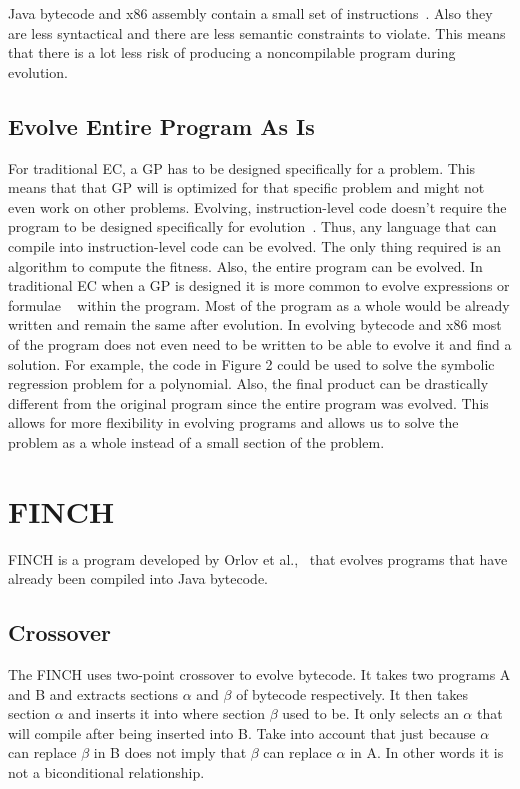 \documentclass{sig-alternate}
\begin{document}
Java bytecode and x86 assembly contain a small set of instructions~\cite{Assembly:2010}. Also they are less syntactical and there are less semantic constraints to violate. This means that there is a lot less risk of producing a noncompilable program during evolution. 

\subsection{Evolve Entire Program As Is}
For traditional EC, a GP has to be designed specifically for a problem. This means that that GP will is optimized for that specific problem and might not even work on other problems.  Evolving, instruction-level code doesn't require the program to be designed specifically for evolution~\cite{Assembly:2010,FINCH:2011}. Thus, any language that can compile into instruction-level code can be evolved. The only thing required is an algorithm to compute the fitness. Also, the entire program can be evolved. In traditional EC when a GP is designed it is more common to evolve expressions or formulae ~\cite{FINCH:2011} within the program. Most of the program as a whole would be already written and remain the same after evolution. In evolving bytecode and x86 most of the program does not even need to be written to be able to evolve it and find a solution. For example, the code in Figure 2 could be used to solve the symbolic regression problem for a polynomial. Also, the final product can be drastically different from the original program since the entire program was evolved. This allows for more flexibility in evolving programs and allows us to solve the problem as a whole instead of a small section of the problem.


\section{FINCH}
FINCH is a program developed by Orlov et al.,~\cite{FINCH2:2009,FINCH:2011} that evolves programs that have already been compiled into Java bytecode.

\subsection{Crossover}

The FINCH uses two-point crossover to evolve bytecode. It takes two programs A and B and extracts sections $\alpha$ and $\beta$ of bytecode respectively. It then takes section $\alpha$ and inserts it into where section $\beta$ used to be. It only selects an $\alpha$ that will compile after being inserted into B. Take into account that just because $\alpha$ can replace $\beta$ in B does not imply that $\beta$ can replace $\alpha$ in A. In other words it is not a biconditional relationship.
\end{document}
